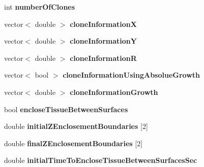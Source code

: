 \begin{DoxyCompactItemize}
\item 
\hypertarget{classSimulation_a794b7d10ce0afdac0076591da13edc6d}{}int {\bfseries number\+Of\+Clones}\label{classSimulation_a794b7d10ce0afdac0076591da13edc6d}

\item 
\hypertarget{classSimulation_a81e94b55f267f695f4306ae9047796da}{}vector$<$ double $>$ {\bfseries clone\+Information\+X}\label{classSimulation_a81e94b55f267f695f4306ae9047796da}

\item 
\hypertarget{classSimulation_a36128434ec60a04ce4bb648c79f72848}{}vector$<$ double $>$ {\bfseries clone\+Information\+Y}\label{classSimulation_a36128434ec60a04ce4bb648c79f72848}

\item 
\hypertarget{classSimulation_a9e23247b7d3fc093ec64ac65b12f8421}{}vector$<$ double $>$ {\bfseries clone\+Information\+R}\label{classSimulation_a9e23247b7d3fc093ec64ac65b12f8421}

\item 
\hypertarget{classSimulation_a6d8b7803f55b4c2d55c1a433286f9acd}{}vector$<$ bool $>$ {\bfseries clone\+Information\+Using\+Absolue\+Growth}\label{classSimulation_a6d8b7803f55b4c2d55c1a433286f9acd}

\item 
\hypertarget{classSimulation_a6b077f65fab62999cd6e5d02633188be}{}vector$<$ double $>$ {\bfseries clone\+Information\+Growth}\label{classSimulation_a6b077f65fab62999cd6e5d02633188be}

\item 
\hypertarget{classSimulation_a5f78710998d8706eb7e15857eb03ccc6}{}bool {\bfseries enclose\+Tissue\+Between\+Surfaces}\label{classSimulation_a5f78710998d8706eb7e15857eb03ccc6}

\item 
\hypertarget{classSimulation_a4b273b605ad9f2dafb4b4ea22b3a4d92}{}double {\bfseries initial\+Z\+Enclosement\+Boundaries} \mbox{[}2\mbox{]}\label{classSimulation_a4b273b605ad9f2dafb4b4ea22b3a4d92}

\item 
\hypertarget{classSimulation_a8741a8f397eceac3a4f7d40009ada8a4}{}double {\bfseries final\+Z\+Enclosement\+Boundaries} \mbox{[}2\mbox{]}\label{classSimulation_a8741a8f397eceac3a4f7d40009ada8a4}

\item 
\hypertarget{classSimulation_adc4fdde612c109d01508eb4c8d49f76a}{}double {\bfseries initial\+Time\+To\+Enclose\+Tissue\+Between\+Surfaces\+Sec}\label{classSimulation_adc4fdde612c109d01508eb4c8d49f76a}


\end{DoxyCompactItemize}
